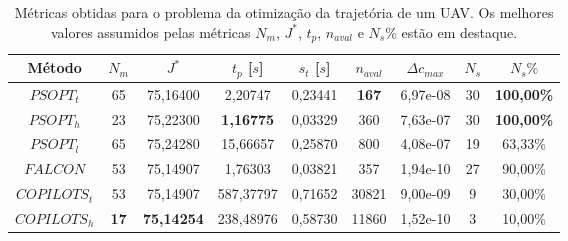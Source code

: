 \begin{table}[!h]
	\centering
	\caption[Métricas  obtidas  para  o  problema da otimização da trajetória de um UAV]{Métricas  obtidas  para  o  problema da otimização da trajetória de um UAV. Os melhores valores assumidos pelas métricas $ N_m $, $ J^* $, $ t_p $, $ n_{aval} $ e $ N_s\% $ estão em destaque.}
	\label{tab:uav:raw}
	\begin{tabular}{@{}ccccccccc@{}}
		\toprule
		Método       & $N_m$                              & $J^*$                                    & $t_p$ {[}$s${]}                         & $s_t$ {[}$s${]} & $n_{aval}$                          & $\Delta c_{max}$                         & $N_s$ & $N_s\%$                                  \\ \midrule
		$PSOPT_t$    & 65                                 & 75,16400                                 & 2,20747                                 & 0,23441         & {\color[HTML]{009901} \textbf{167}} & 6,97e-08                                 & 30    & {\color[HTML]{009901} \textbf{100,00\%}} \\
		$PSOPT_h$    & 23                                 & 75,22300                                 & {\color[HTML]{009901} \textbf{1,16775}} & 0,03329         & 360                                 & 7,63e-07                                 & 30    & {\color[HTML]{009901} \textbf{100,00\%}} \\
		$PSOPT_l$    & 65                                 & 75,24280                                 & 15,66657                                & 0,25870         & 800                                 & 4,08e-07                                 & 19    & 63,33\%                                  \\
		$FALCON$     & 53                                 & 75,14907                                 & 1,76303                                 & 0,03821         & 357                                 & 1,94e-10                                 & 27    & 90,00\%                                  \\
		$COPILOTS_t$ & 53                                 & 75,14907                                 & 587,37797                               & 0,71652         & 30821                               & 9,00e-09                                 & 9     & 30,00\%                                  \\
		$COPILOTS_h$ & {\color[HTML]{009901} \textbf{17}} & {\color[HTML]{009901} \textbf{75,14254}} & 238,48976                               & 0,58730         & 11860                               & 1,52e-10 & 3     & 10,00\%                                  \\ \bottomrule
	\end{tabular}
\end{table}